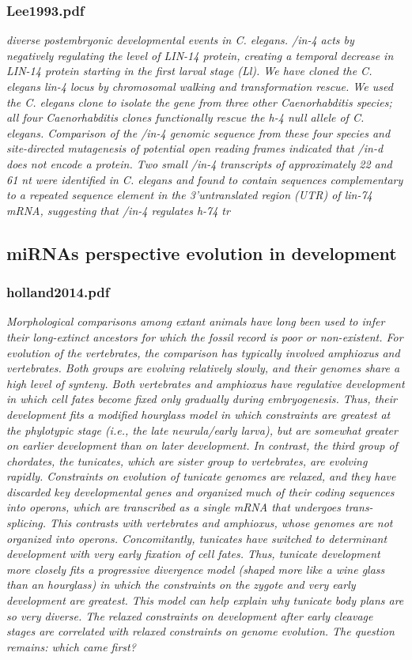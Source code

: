 \documentclass[graybox]{svmult}
\begin{document}
\subsubsection{Lee1993.pdf}

\cite{Lee1993}
\textit{diverse postembryonic developmental events in C.
elegans. /in-4 acts by negatively regulating the level of
LIN-14 protein, creating a temporal decrease in LIN-14
protein starting in the first larval stage (Ll). We have
cloned the C. elegans lin-4 locus by chromosomal
walking and transformation rescue. We used the C.
elegans clone to isolate the gene from three other
Caenorhabditis species; all four Caenorhabditis clones
functionally rescue the h-4 null allele of C. elegans.
Comparison of the /in-4 genomic sequence from these
four species and site-directed mutagenesis of potential
open reading frames indicated that /in-d does not
encode a protein. Two small /in-4 transcripts of approximately
22 and 61 nt were identified in C. elegans and
found to contain sequences complementary to a repeated
sequence element in the 3’untranslated region
(UTR) of lin-74 mRNA, suggesting that /in-4 regulates
h-74 tr}


\subsection{miRNAs perspective evolution in development}

\subsubsection{holland2014.pdf}
\cite{Holland2015} \textit{
Morphological comparisons among extant animals have long been used to infer their long-extinct ancestors for which the fossil record is poor or non-existent. For evolution of the vertebrates, the comparison has typically involved amphioxus and vertebrates. Both groups are evolving relatively slowly, and their genomes share a high level of synteny. Both vertebrates and amphioxus have regulative development in which cell fates become fixed only gradually during embryogenesis. Thus, their development fits a modified hourglass model in which constraints are greatest at the phylotypic stage (i.e., the late neurula/early larva), but are somewhat greater on earlier development than on later development. In contrast, the third group of chordates, the tunicates, which are sister group to vertebrates, are evolving rapidly. Constraints on evolution of tunicate genomes are relaxed, and they have discarded key developmental genes and organized much of their coding sequences into operons, which are transcribed as a single mRNA that undergoes trans-splicing. This contrasts with vertebrates and amphioxus, whose genomes are not organized into operons. Concomitantly, tunicates have switched to determinant development with very early fixation of cell fates. Thus, tunicate development more closely fits a progressive divergence model (shaped more like a wine glass than an hourglass) in which the constraints on the zygote and very early development are greatest. This model can help explain why tunicate body plans are so very diverse. The relaxed constraints on development after early cleavage stages are correlated with relaxed constraints on genome evolution. The question remains: which came first?}
\end{document}
